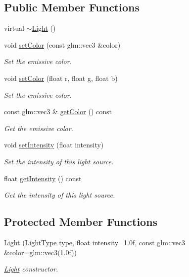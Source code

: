 \subsection*{Public Member Functions}
\begin{DoxyCompactItemize}
\item 
virtual \mbox{\hyperlink{classec_1_1_light_af9024a28fff2403705d1a6e9cad4a128}{$\sim$\+Light}} ()
\item 
void \mbox{\hyperlink{classec_1_1_light_ab3a3ade92e06121c965216fb168ef5db}{set\+Color}} (const glm\+::vec3 \&color)
\begin{DoxyCompactList}\small\item\em Set the emissive color. \end{DoxyCompactList}\item 
void \mbox{\hyperlink{classec_1_1_light_aaa6d6edfe31b15dc259a8fa0d59ef8de}{set\+Color}} (float r, float g, float b)
\begin{DoxyCompactList}\small\item\em Set the emissive color. \end{DoxyCompactList}\item 
const glm\+::vec3 \& \mbox{\hyperlink{classec_1_1_light_a3eaa8c20fc0d48588078bd82f13fbaef}{get\+Color}} () const
\begin{DoxyCompactList}\small\item\em Get the emissive color. \end{DoxyCompactList}\item 
void \mbox{\hyperlink{classec_1_1_light_ae2b2bbbc88aef9d531627bb90f7b0183}{set\+Intensity}} (float intensity)
\begin{DoxyCompactList}\small\item\em Set the intensity of this light source. \end{DoxyCompactList}\item 
float \mbox{\hyperlink{classec_1_1_light_a8380a3371b458030258bcf7a39857e17}{get\+Intensity}} () const
\begin{DoxyCompactList}\small\item\em Get the intensity of this light source. \end{DoxyCompactList}\end{DoxyCompactItemize}
\subsection*{Protected Member Functions}
\begin{DoxyCompactItemize}
\item 
\mbox{\hyperlink{classec_1_1_light_a7816fc3b8f92cd0ac732be6944754995}{Light}} (\mbox{\hyperlink{namespaceec_a30e2a743ebdeb02ac68a6cfa50f629c7}{Light\+Type}} type, float intensity=1.\+0f, const glm\+::vec3 \&color=glm\+::vec3(1.\+0f))
\begin{DoxyCompactList}\small\item\em \mbox{\hyperlink{classec_1_1_light}{Light}} constructor. \end{DoxyCompactList}\end{DoxyCompactItemize}
